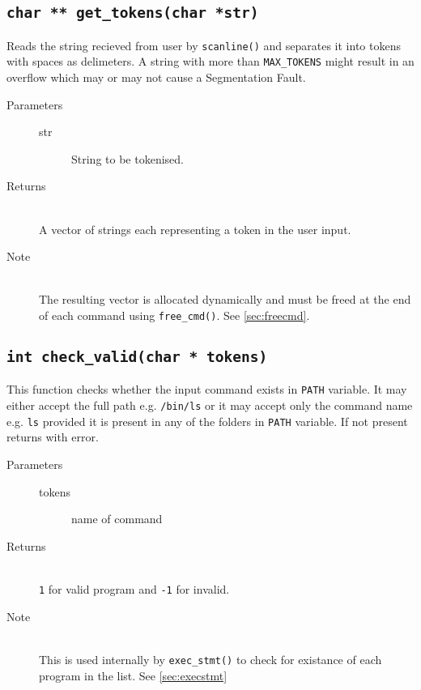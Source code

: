 \documentclass{article}
\begin{document}
\subsection{\lstinline{char ** get_tokens(char *str)}} \label{sec:gettokens}
Reads the string recieved from user by \lstinline{scanline()} and separates it into tokens with spaces as delimeters. A string with more than \lstinline{MAX_TOKENS} might result in an overflow which may or may not cause a Segmentation Fault.
\begin{description}
	\item[Parameters]\hfill
	\begin{description}
		\item[str] String to be tokenised.
	\end{description}
	\item[Returns]\hfill\\
		A vector of strings each representing a token in the user input.
	\item[Note]\hfill\\
		The resulting vector is allocated dynamically and must be freed at the end of each command using \lstinline{free_cmd()}. See \ref{sec:freecmd}.
\end{description}

\subsection{\lstinline{int check_valid(char * tokens)}}
This function checks whether the input command exists in \lstinline{PATH} variable. It may either accept the full path e.g. \lstinline{/bin/ls} or it may accept only the command name e.g. \lstinline{ls} provided it is present in any of the folders in \lstinline{PATH} variable. If not present returns with error.
\begin{description}
	\item[Parameters]\hfill
	\begin{description}
		\item[tokens] name of command
	\end{description}
	\item[Returns]\hfill\\
		\lstinline{1} for valid program and \lstinline{-1} for invalid.
	\item[Note]\hfill\\
		This is used internally by \lstinline{exec_stmt()} to check for existance of each program in the list. See \ref{sec:execstmt}
\end{description}
\end{document}
